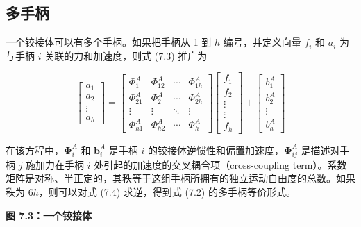 \documentclass[10pt,a4paper]{book}
\theoremstyle{thmstyle} %
\theoremstyle{defstyle} %
\theoremstyle{prostyle} %
\begin{document}
\subsection{多手柄}





一个铰接体可以有多个手柄。如果把手柄从 1 到 $h$ 编号，并定义向量 $f_i$ 和 $a_i$ 为与手柄 $i$ 关联的力和加速度，则式 (7.3) 推广为



$$
\left[ \begin{array}{l} { a _ { 1 } } \\{ a _ { 2 } } \\{ \vdots } \\{ a _ { h } } \end{array} \right] = \left[ \begin{array}{llll} { \Phi _ { 1 }^{A} } & { \Phi _ { 12 }^{A} } & { \cdots } & { \Phi _ { 1 h }^{A} } \\{ \Phi _ { 21 }^{A} } & { \Phi _ { 2 }^{A} } & { \cdots } & { \Phi _ { 2 h }^{A} } \\{ \vdots } & { \vdots } & { \ddots } & { \vdots } \\{ \Phi _ { h 1 }^{A} } & { \Phi _ { h 2 }^{A} } & { \cdots } & { \Phi _ { h }^{A} } \end{array} \right] \left[ \begin{array}{l} { f _ { 1 } } \\{ f _ { 2 } } \\{ \vdots } \\{ \vdots } \\{ f _ { h } } \end{array} \right] + \left[ \begin{array}{l} { b _ { 1 }^{A} } \\{ b _ { 2 }^{A} } \\{ \vdots } \\{ b _ { h }^{A} } \end{array} \right]
$$



在该方程中，$\boldsymbol{\Phi}_{i}^{A}$ 和 $\boldsymbol{b}_{i}^{A}$ 是手柄 $i$ 的铰接体逆惯性和偏置加速度，$\boldsymbol{\Phi}_{ij}^{A}$ 是描述对手柄 $j$ 施加力在手柄 $i$ 处引起的加速度的交叉耦合项（cross-coupling term）。系数矩阵是对称、半正定的，其秩等于这组手柄所拥有的独立运动自由度的总数。如果秩为 $6h$，则可以对式 (7.4) 求逆，得到式 (7.2) 的多手柄等价形式。



\noindent\textbf{图 7.3：一个铰接体}
\end{document}
